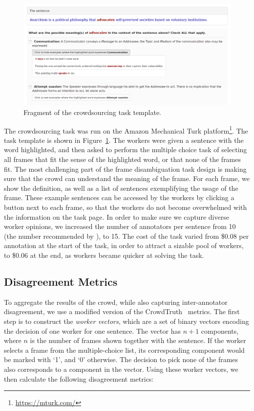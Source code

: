 \begin{figure}[thb!]
\centering
\includegraphics[width=\textwidth]{img/sent-frame.png}
\caption{Fragment of the crowdsourcing task template.}
\label{fig:ch5template}
\end{figure}


The crowdsourcing task was run on the Amazon Mechanical Turk platform\footnote{\url{https://mturk.com/}}. The task template is shown in Figure~\ref{fig:ch5template}. The workers were given a sentence with the word highlighted, and then asked to perform the multiple choice task of selecting all frames that fit the sense of the highlighted word, or that none of the frames fit. The most challenging part of the frame disambiguation task design is making sure that the crowd can understand the meaning of the frame. For each frame, we show the definition, as well as a list of sentences exemplifying the usage of the frame. These example sentences can be accessed by the workers by clicking a button next to each frame, so that the workers do not become overwhelmed with the information on the task page. In order to make sure we capture diverse worker opinions, we increased the number of annotators per sentence from 10 (the number recommended by \citet{Hong:2011:GCR:2018966.2018970}), to 15. The cost of the task varied from \$0.08 per annotation at the start of the task, in order to attract a sizable pool of workers, to \$0.06 at the end, as workers became quicker at solving the task.

\subsection{Disagreement Metrics}
\label{sec:frame-metrics}

To aggregate the results of the crowd, while also capturing inter-annotator disagreement, we use a modified version of the CrowdTruth~\cite{aroyo2014threesides} metrics. The first step is to construct the \textit{worker vectors}, which are a set of binary vectors encoding the decision of one worker for one sentence. The vector has $n+1$ components, where $n$ is the number of frames shown together with the sentence. If the worker selects a frame from the multiple-choice list, its corresponding component would be marked with `1', and `0' otherwise. The decision to pick none of the frames also corresponds to a component in the vector. Using these worker vectors, we then calculate the following disagreement metrics:

